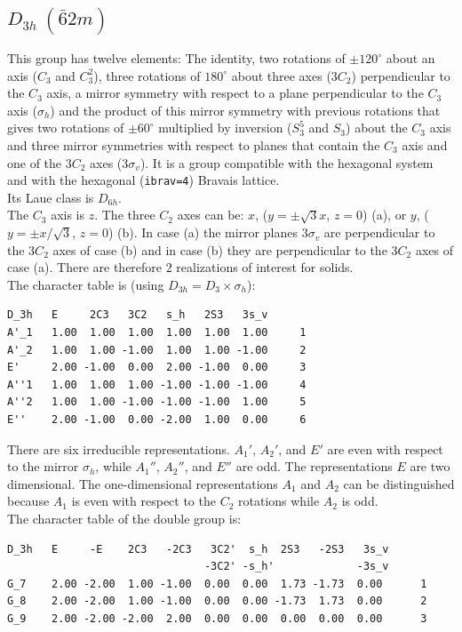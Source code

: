 \documentclass[12pt,a4paper]{article}
\begin{document}
\subsection{\color{web-blue}$D_{3h}\ (\bar 62m)$} 
This group has twelve elements: The identity, two rotations of $\pm120^\circ$
about an axis ($C_3$ and $C_3^2$), three rotations of $180^\circ$
about three axes ($3C_2$) perpendicular to the $C_3$ axis,
a mirror symmetry with respect to a plane perpendicular to the $C_3$ axis 
($\sigma_h$) and the product of this mirror symmetry with previous rotations
that gives two rotations of $\pm 60^\circ$ multiplied by inversion 
($S_3^5$ and $S_3$) about the $C_3$ axis and three mirror symmetries with respect 
to planes that contain the $C_3$ axis and one of the $3C_2$ axes
($3\sigma_v$). 
It is a group compatible with the hexagonal system 
and with the hexagonal (\texttt{ibrav=4}) Bravais lattice. \\
Its Laue class is $D_{6h}$. \\
The $C_3$ axis is $z$.
The three $C_2$ axes can be: $x$, ($y=\pm \sqrt{3} x$, $z=0$) (a), or
$y$, ($y=\pm x/\sqrt{3}$, $z=0$) (b). In case (a) the mirror planes 
$3\sigma_v$ are perpendicular to the $3C_2$ axes of case (b) and in case (b) 
they are perpendicular to the $3C_2$ axes of case (a).
There are therefore $2$ realizations of interest for solids. \\
The character table is (using $D_{3h}=D_3 \times \sigma_h$):
\begin{verbatim}
D_3h   E     2C3   3C2   s_h   2S3   3s_v 
A'_1   1.00  1.00  1.00  1.00  1.00  1.00     1
A'_2   1.00  1.00 -1.00  1.00  1.00 -1.00     2
E'     2.00 -1.00  0.00  2.00 -1.00  0.00     3
A''1   1.00  1.00  1.00 -1.00 -1.00 -1.00     4
A''2   1.00  1.00 -1.00 -1.00 -1.00  1.00     5
E''    2.00 -1.00  0.00 -2.00  1.00  0.00     6
\end{verbatim}
There are six irreducible representations. $A_1'$, $A_2'$, and $E'$ are
even with respect to the mirror $\sigma_h$, while
$A_1''$, $A_2''$, and $E''$ are odd. The representations $E$ are
two dimensional. The one-dimensional representations $A_1$ and $A_2$ can
be distinguished because $A_1$ is even with respect to the $C_2$ rotations
while $A_2$ is odd. \\
The character table of the double group is:
\begin{verbatim}
D_3h   E     -E    2C3   -2C3   3C2'  s_h  2S3   -2S3   3s_v
                               -3C2' -s_h'             -3s_v
G_7    2.00 -2.00  1.00 -1.00  0.00  0.00  1.73 -1.73  0.00      1
G_8    2.00 -2.00  1.00 -1.00  0.00  0.00 -1.73  1.73  0.00      2
G_9    2.00 -2.00 -2.00  2.00  0.00  0.00  0.00  0.00  0.00      3
\end{verbatim}
\end{document}
